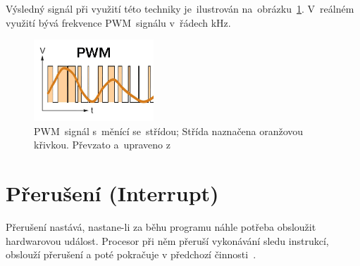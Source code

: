 Výsledný signál při využití této techniky je~ilustrován na~obrázku~\ref{fig:pwm}. V~reálném využití bývá frekvence PWM~signálu v~řádech kHz.

\begin{figure}[htb]
  \centering
  \includegraphics[width=0.4\textwidth]{img/pwm.jpg}
  \caption{\label{fig:pwm} PWM~signál s~měnící se~střídou; Střída naznačena oranžovou křivkou. Převzato a~upraveno z~\cite{pwm-image}}
\end{figure}

\section{Přerušení (Interrupt)}
Přerušení nastává, nastane-li za běhu programu náhle potřeba obsloužit hardwarovou událost. Procesor při něm přeruší vykonávání sledu instrukcí, obslouží přerušení a poté pokračuje v předchozí činnosti~\cite{wiki-interrupt}.
